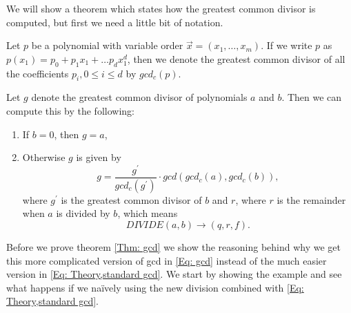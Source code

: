 We will show a theorem which states how the greatest common divisor is computed, but first we need a little bit of notation.
\begin{definition}
  Let $p$ be a polynomial with variable order $\vec{x}=(x_1,\ldots,x_m)$. If we write $p$ as $p(x_1)=p_0+p_1x_1+\ldots p_dx_1^d$, then we denote the greatest common divisor of all the coefficients $p_i, 0\leq i\leq d$ by $gcd_c(p)$.
\end{definition}
\begin{theorem}\label{Thm: gcd}
  Let $g$ denote the greatest common divisor of polynomials $a$ and $b$. Then we can compute this by the following:
  \begin{enumerate}
    \item If $b=0$, then $g=a$,
    \item Otherwise $g$ is given by
    \begin{equation}\label{Eq: gcd}
      g=\frac{g^\prime}{gcd_c(g^\prime)}\cdot gcd(gcd_c(a),gcd_c(b)),
    \end{equation}
    where $g^\prime$ is the greatest common divisor of $b$ and $r$, where $r$ is the remainder when $a$ is divided by $b$, which means
    \begin{equation}
      DIVIDE(a,b) \rightarrow (q,r,f).
    \end{equation}
  \end{enumerate}
\end{theorem}
Before we prove theorem \ref{Thm: gcd} we show the reasoning behind why we get this more complicated version of gcd in \ref{Eq: gcd} instead of the much easier version in \ref{Eq: Theory,standard gcd}. We start by showing the example and see what happens if we naïvely using the new division combined with \ref{Eq: Theory,standard gcd}.

